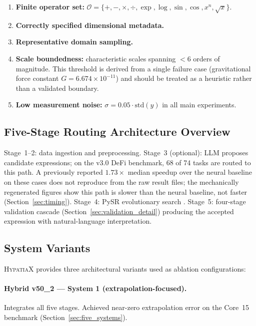 \documentclass[twoside,11pt]{article}
\begin{document}
\begin{enumerate}
\item \textbf{Finite operator set:}
  $\mathcal{O} = \{+,-,\times,\div,\exp,\log,\sin,\cos,x^n,\sqrt{x}\}$.
\item \textbf{Correctly specified dimensional metadata.}
\item \textbf{Representative domain sampling.}
\item \textbf{Scale boundedness:} characteristic scales spanning
  $<6$ orders of magnitude.
  This threshold is derived from a single failure case (gravitational force
  constant $G = 6.674 \times 10^{-11}$) and should be treated as a heuristic
  rather than a validated boundary.
\item \textbf{Low measurement noise:}
  $\sigma = 0.05 \cdot \mathrm{std}(y)$ in all main experiments.
\end{enumerate}

\subsection{Five-Stage Routing Architecture Overview}\label{subsec:fivestage-routing-architecture-overview}
\label{sec:validation_framework}

Stage~1--2: data ingestion and preprocessing.
Stage~3 (optional): LLM proposes candidate expressions; on the v3.0 DeFi
benchmark, 68 of 74 tasks are routed to this path. A previously reported
$1.73\times$ median speedup over the neural baseline on these cases does
not reproduce from the raw result files; the mechanically regenerated
figures show this path is slower than the neural baseline, not faster
(Section~\ref{sec:timing}).
Stage~4: PySR evolutionary search \citep{cranmer2023pysr}.
Stage~5: four-stage validation cascade (Section~\ref{sec:validation_detail})
producing the accepted expression with natural-language interpretation.

\subsection{System Variants}\label{subsec:system-variants}
\label{sec:arch_variants}

\textsc{HypatiaX} provides three architectural variants used as ablation
configurations:

\paragraph{Hybrid v50\_2 --- System 1 (extrapolation-focused).}
Integrates all five stages.  Achieved near-zero extrapolation error on the
Core~15 benchmark (Section~\ref{sec:five_systems}).
\end{document}
